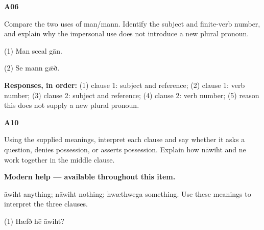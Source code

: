 \par\begin{minipage}{\linewidth}\raggedright
\textbf{A06}

Compare the two uses of man/\allowbreak{}mann. Identify the subject and finite-verb number, and explain why the impersonal use does not introduce a new plural pronoun.

(1) Man sceal gān.

(2) Se mann gǣð.

\textbf{Responses, in order:} (1) clause 1: subject and reference; (2) clause 1: verb number; (3) clause 2: subject and reference; (4) clause 2: verb number; (5) reason this does not supply a new plural pronoun.

\end{minipage}\par\addvspace{4pt}

\par\begin{minipage}{\linewidth}\raggedright
\textbf{A10}

Using the supplied meanings, interpret each clause and say whether it asks a question, denies possession, or asserts possession. Explain how nāwiht and ne work together in the middle clause.

\textbf{Modern help — available throughout this item.}

\end{minipage}\par\addvspace{4pt}

āwiht anything; nāwiht nothing; hwæthwega something. Use these meanings to interpret the three clauses.

(1) Hæfð hē āwiht?

